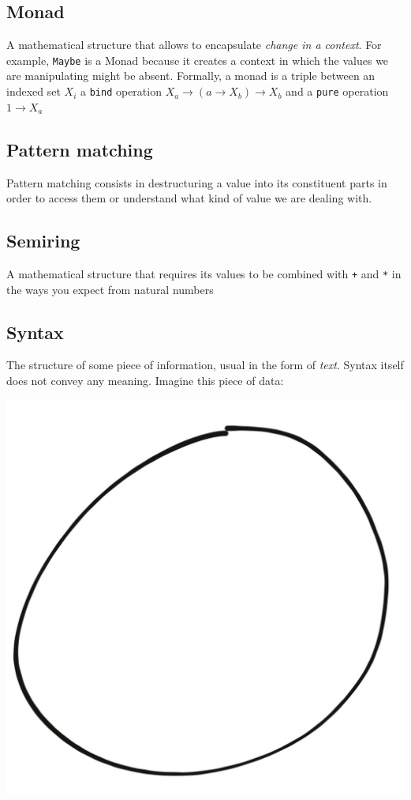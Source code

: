 \documentclass[
]{article}
\begin{document}
\hypertarget{monad}{%
\subsection{Monad}\label{monad}}

A mathematical structure that allows to encapsulate \emph{change in a
context}. For example, \texttt{Maybe} is a Monad because it creates a
context in which the values we are manipulating might be absent.
Formally, a monad is a triple between an indexed set \(X_i\) a
\texttt{bind} operation \(X_a \to (a \to X_b) \to X_b\) and a
\texttt{pure} operation \(1 \to X_a\)

\hypertarget{pattern-matching-1}{%
\subsection{Pattern matching}\label{pattern-matching-1}}

Pattern matching consists in destructuring a value into its constituent
parts in order to access them or understand what kind of value we are
dealing with.

\hypertarget{semiring}{%
\subsection{Semiring}\label{semiring}}

A mathematical structure that requires its values to be combined with
\texttt{+} and \texttt{*} in the ways you expect from natural numbers

\hypertarget{syntax-1}{%
\subsection{Syntax}\label{syntax-1}}

The structure of some piece of information, usual in the form of
\emph{text}. Syntax itself does not convey any meaning. Imagine this
piece of data:

\includegraphics{Zero.jpg}
\end{document}
